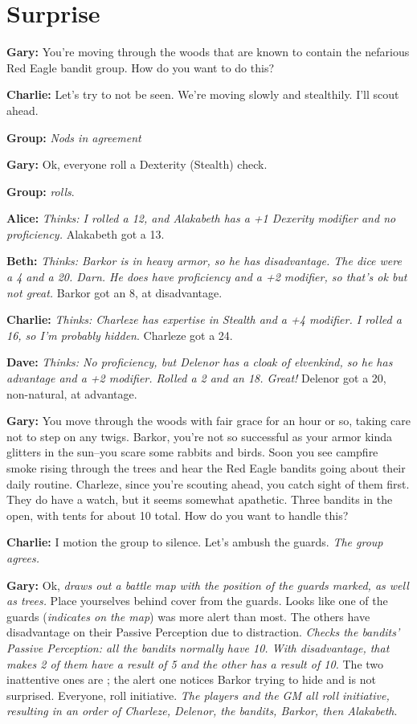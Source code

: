 \section{Surprise}\label{example:surprise}
\textbf{Gary:} You're moving through the woods that are known to contain the nefarious Red Eagle bandit group. How do you want to do this?

\textbf{Charlie:} Let's try to not be seen. We're moving slowly and stealthily. I'll scout ahead. 

\textbf{Group:} \textit{Nods in agreement}

\textbf{Gary:} Ok, everyone roll a Dexterity (Stealth) check.

\textbf{Group:} \textit{rolls}.

\textbf{Alice:} \textit{Thinks: I rolled a 12, and Alakabeth has a +1 Dexerity modifier and no proficiency.} Alakabeth got a 13.

\textbf{Beth:} \textit{Thinks: Barkor is in heavy armor, so he has disadvantage. The dice were a 4 and a 20. Darn. He does have proficiency and a +2 modifier, so that's ok but not great.} Barkor got an 8, at disadvantage.

\textbf{Charlie:} \textit{Thinks: Charleze has expertise in Stealth and a +4 modifier. I rolled a 16, so I'm probably hidden}. Charleze got a 24.

\textbf{Dave:} \textit{Thinks: No proficiency, but Delenor has a cloak of elvenkind, so he has advantage and a +2 modifier. Rolled a 2 and an 18. Great!} Delenor got a 20, non-natural, at advantage.

\textbf{Gary:} You move through the woods with fair grace for an hour or so, taking care not to step on any twigs. Barkor, you're not so successful as your armor kinda glitters in the sun--you scare some rabbits and birds. Soon you see campfire smoke rising through the trees and hear the Red Eagle bandits going about their daily routine. Charleze, since you're scouting ahead, you catch sight of them first. They do have a watch, but it seems somewhat apathetic. Three bandits in the open, with tents for about 10 total. How do you want to handle this?

\textbf{Charlie:} I motion the group to silence. Let's ambush the guards. \textit{The group agrees.}

\textbf{Gary:} Ok, \textit{draws out a battle map with the position of the guards marked, as well as trees.} Place yourselves behind cover from the guards. Looks like one of the guards (\textit{indicates on the map}) was more alert than most. The others have disadvantage on their Passive Perception due to distraction. \textit{Checks the bandits' Passive Perception: all the bandits normally have 10. With disadvantage, that makes 2 of them have a result of 5 and the other has a result of 10.} The two inattentive ones are ; the alert one notices Barkor trying to hide and is not surprised. Everyone, roll initiative. \textit{The players and the GM all roll initiative, resulting in an order of Charleze, Delenor, the bandits, Barkor, then Alakabeth}.

